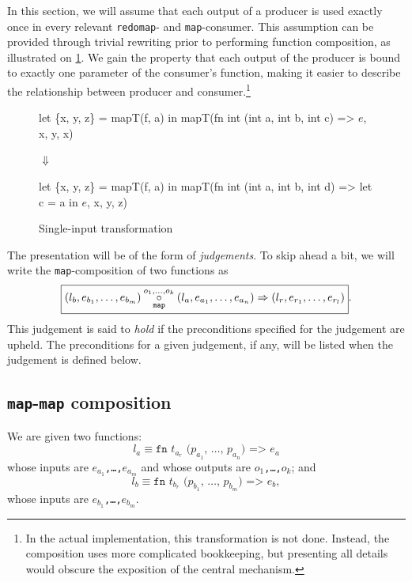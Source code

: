 In this section, we will assume that each output of a producer is used
exactly once in every relevant \texttt{redomap}- and
\texttt{map}-consumer.  This assumption can be provided through
trivial rewriting prior to performing function composition, as
illustrated on \cref{fig:single-input-transform}.  We gain the
property that each output of the producer is bound to exactly one
parameter of the consumer's function, making it easier to describe the
relationship between producer and consumer.\footnote{In the actual
  implementation, this transformation is not done.  Instead, the
  composition uses more complicated bookkeeping, but presenting all
  details would obscure the exposition of the central mechanism.}

\begin{figure}
\begin{center}
\begin{bcolorcode}
let \{x, y, z\} = mapT(f, a) in
mapT(fn int (int a, int b, int c) => \(e\), x, y, x)
\end{bcolorcode}

$\Downarrow$

\begin{bcolorcode}
let \{x, y, z\} = mapT(f, a) in
mapT(fn int (int a, int b, int d) =>
       let c = a in \(e\),
     x, y, z)
\end{bcolorcode}
\end{center}
\caption{Single-input transformation}
\label{fig:single-input-transform}
\end{figure}

The presentation will be of the form of \textit{judgements}.  To skip
ahead a bit, we will write the \texttt{map}-composition of two
functions as
\[
\boxed{
(l_{b},e_{b_{1}},\ldots,e_{b_{m}}) \underset{\texttt{map}}{\overset{o_1,\ldots,o_k}\circ}(l_{a},e_{a_{1}},\ldots,e_{a_{n}}) \Rightarrow (l_{r},e_{r_{1}},\ldots,e_{r_{l}})
}.
\]
This judgement is said to \textit{hold} if the preconditions specified
for the judgement are upheld.  The preconditions for a given
judgement, if any, will be listed when the judgement is defined below.

\subsection{\texttt{map}-\texttt{map} composition}
\label{sec:map-map-composition}

We are given two functions:
\[
l_{a}\equiv\texttt{fn $t_{a_{r}}$ ($p_{a_{1}}$, \ldots, $p_{a_{n}}$) => $e_{a}$}
\]
whose inputs are \texttt{$e_{a_{1}}$,\ldots,$e_{a_{m}}$} and whose
outputs are \texttt{$o_1$,\ldots,$o_k$}; and
\[
l_{b}\equiv\texttt{fn $t_{b_{r}}$ ($p_{b_{1}}$, \ldots, $p_{b_{m}}$) => $e_{b}$},
\]
whose inputs are \texttt{$e_{b_{1}}$,\ldots,$e_{b_{m}}$}.

